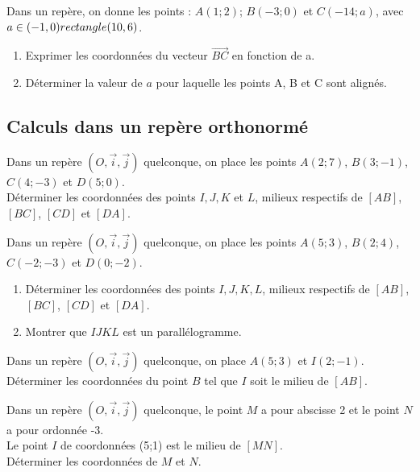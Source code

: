 {\begin{Exercice}
Dans un repère, on donne les points :
$ A(1;2) $; $ B(-3;0) $ et $ C(-14;a) $, avec $ a \in (-1,0) rectangle (10,6) $.
\begin{enumerate}
	\item Exprimer les coordonnées du vecteur $ \overrightarrow{BC} $ en fonction de a.
	\item Déterminer la valeur de $ a $ pour laquelle les points A, B et C sont alignés.

\end{enumerate}
\end{Exercice}

\newpage

\subsection*{Calculs dans un repère orthonormé}

\begin{Exercice}
Dans un repère \((O,\vec{i},\vec{j})\) quelconque, on place les points \(A(2;7)\), \(B(3;-1)\), \(C(4;-3)\) et \(D(5;0)\). \\
Déterminer les coordonnées des points \(I, J, K\) et \(L\), milieux respectifs de \([AB]\), \([BC]\), \([CD]\) et \([DA]\).
\end{Exercice}

\begin{Exercice}
Dans un repère \((O,\vec{i},\vec{j})\) quelconque, on place les points \(A(5;3)\), \(B(2;4)\), \(C(-2;-3)\) et \(D(0;-2)\).

\begin{enumerate}
    \item Déterminer les coordonnées des points \(I, J, K, L\), milieux respectifs de \([AB]\), \([BC]\), \([CD]\) et \([DA]\).
    \item Montrer que \(IJKL\) est un parallélogramme.
\end{enumerate}
\end{Exercice}

\begin{Exercice}
Dans un repère \((O,\vec{i},\vec{j})\) quelconque, on place \(A(5;3)\) et \(I(2;-1)\). \\
Déterminer les coordonnées du point \(B\) tel que \(I\) soit le milieu de \([AB]\).
\end{Exercice}

\begin{Exercice}
Dans un repère \((O,\vec{i},\vec{j})\) quelconque, le point \(M\) a pour abscisse 2 et le point \(N\) a pour ordonnée -3. \\
Le point \(I\) de coordonnées (5;1) est le milieu de \([MN]\).\\
 Déterminer les coordonnées de \(M\) et \(N\).
\end{Exercice}

}
